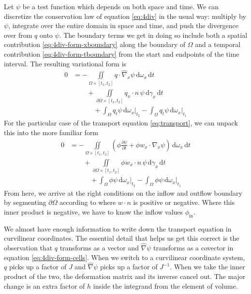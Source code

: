 \documentclass[gmd, manuscript]{copernicus}
\begin{document}
Let $\psi$ be a test function which depends on both space and time.
We can discretize the conservation law of equation \eqref{eq:4div} in the usual way: multiply by $\psi$, integrate over the entire domain in space and time, and push the divergence over from $q$ onto $\psi$.
The boundary terms we get in doing so include both a spatial contribution \eqref{eq:4div-form-xboundary} along the boundary of $\Omega$ and a temporal contribution \eqref{eq:4div-form-tboundary} from the start and endpoints of the time interval.
The resulting variational form is
\begin{subequations}
    \begin{align}
        0 & = -\iint\limits_{\Omega\times[t_1, t_2]}q\cdot\hat{\nabla}_x\psi\,\mathrm{d}\omega_x\,\mathrm{d} t \label{eq:4div-form-cells} \\
        & \qquad + \iint\limits_{\partial\Omega\times[t_1, t_2]}q_x\cdot n\,\psi\,\mathrm{d}\gamma_x\,\mathrm{d} t \label{eq:4div-form-xboundary}\\
        & \qquad\quad + \int_\Omega q_t\psi\,\mathrm{d}\omega_x\Bigg|_{t_2} - \int_\Omega q_t\psi\,\mathrm{d}\omega_x\Bigg|_{t_1} \label{eq:4div-form-tboundary}
    \end{align}
\end{subequations}
For the particular case of the transport equation \eqref{eq:transport}, we can unpack this into the more familiar form
\begin{subequations}
    \label{eq:transport-git}
    \begin{align}
        0 & = -\iint\limits_{\Omega\times[t_1, t_2]}\left(\phi\frac{\partial\psi}{\partial t} + \phi w_x\cdot\nabla_x\psi\right)\,\mathrm{d}\omega_x\,\mathrm{d} t \\
        & \qquad + \iint\limits_{\partial\Omega\times[t_1, t_2]}\phi w_x\cdot n\,\psi\,\mathrm{d}\gamma_x\,\mathrm{d} t \\
        & \qquad\quad + \int_\Omega \phi\psi\,\mathrm{d}\omega_x\Bigg|_{t_2} - \int_\Omega \phi\psi\,\mathrm{d}\omega_x\Bigg|_{t_1}
    \end{align}
\end{subequations}
From here, we arrive at the right conditions on the inflow and outflow boundary by segmenting $\partial\Omega$ according to where $w\cdot n$ is positive or negative.
Where this inner product is negative, we have to know the inflow values $\phi_{\text{in}}$.

We almost have enough information to write down the transport equation in curvilinear coordinates.
The essential detail that helps us get this correct is the observation that $q$ transforms as a vector and $\hat{\nabla}\psi$ transforms as a covector in equation \eqref{eq:4div-form-cells}.
When we switch to a curvilinear coordinate system, $q$ picks up a factor of $J$ and $\hat{\nabla}\psi$ picks up a factor of $J^{-1}$.
When we take the inner product of the two, the deformation matrix and its inverse cancel out.
The major change is an extra factor of $h$ inside the integrand from the element of volume.
\end{document}

